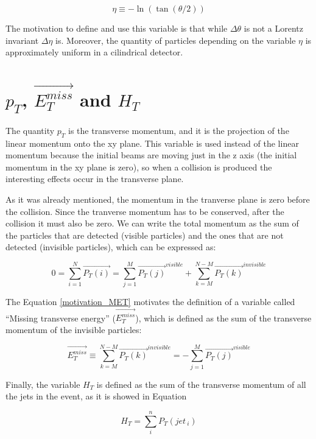 \begin{equation}
 \eta \equiv - \ln \left( \tan (\theta /2 ) \right)
\end{equation}

 The motivation to define and use this variable is that while $\Delta \theta$ is not a Lorentz invariant $\Delta \eta$ is. Moreover, the quantity of particles depending on the variable $\eta$
 is approximately uniform in a cilindrical detector. 
 
  
 \section{$p_T$, $\vec{E_T^{miss}}$ and $H_T$}

 The quantity $p_T$ is the transverse momentum, and it is the projection of the linear momentum onto the xy plane. This variable is used instead of the linear momentum because the initial beams
 are moving just in the z axis (the initial momentum in the xy plane is zero), so when a collision is produced the interesting effects occur in the transverse plane.
 
 As it was already mentioned, the momentum in the tranverse plane is zero before the collision. Since the tranverse momentum has to be conserved, after the collision it must also be zero. We can write
 the total momentum as the sum of the particles that are detected (visible particles) and the ones that are not detected (invisible particles), which can be expressed as:
 
 \begin{equation}
  0 = \sum_{i=1}^N \vec{P_T(i)} = \sum_{j=1}^M \vec{P_T(j)}^{visible} + \sum_{k=M}^{N-M} \vec{P_T(k)}^{invisible}
  \label{motivation_MET}
 \end{equation}

 The Equation \ref{motivation_MET} motivates the definition of a variable called ``Missing transverse energy'' ($\vec{E_T^{miss}}$), which is defined as the sum of the transverse momentum of the invisible
 particles:
 
 \begin{equation}
  \vec{E_T^{miss}} \equiv \sum_{k=M}^{N-M}\vec{P_T(k)}^{invisible} = - \sum_{j=1}^M  \vec{P_T(j)}^{visible}
 \end{equation}

Finally, the variable $H_T$ is defined as the sum of the transverse momentum of all the jets in the event, as it is showed in Equation

\begin{equation}
H_T = \sum_i^n P_T(jet_{\ i})
\end{equation}
 
